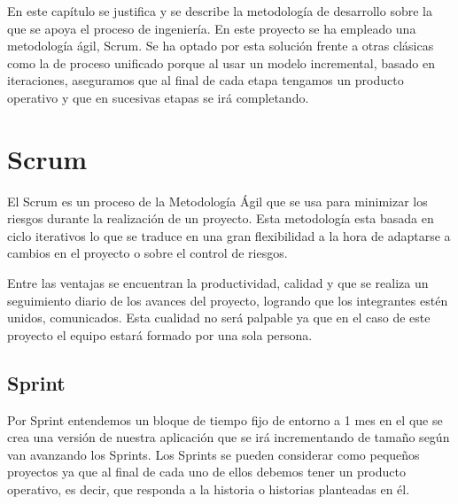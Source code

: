 En este capítulo se justifica y se describe la metodología de desarrollo sobre la que se apoya el proceso de ingeniería. En este proyecto se ha empleado una metodología ágil, Scrum. Se ha optado por esta solución frente a otras clásicas como la de proceso unificado porque al usar un modelo incremental, basado en iteraciones, aseguramos que al final de cada etapa tengamos un producto operativo y que en sucesivas etapas se irá completando.



\section{Scrum}

El Scrum es un proceso de la Metodología Ágil que se usa para minimizar los riesgos durante la realización de un proyecto. 
Esta metodología esta basada en ciclo iterativos lo que se traduce en una gran flexibilidad a la hora de adaptarse a cambios en el proyecto o sobre el control de riesgos. 



Entre las ventajas se encuentran la productividad, calidad y que se realiza un seguimiento diario de los avances del proyecto, logrando que los integrantes estén unidos, comunicados. Esta cualidad no será palpable ya que en el caso de este proyecto el equipo estará formado por una sola persona.\\

\subsection{Sprint}

Por Sprint entendemos un bloque de tiempo fijo de entorno a 1 mes en el que
se crea una versión de nuestra aplicación que se irá incrementando de tamaño
según van avanzando los Sprints. Los Sprints se pueden considerar como pequeños
proyectos ya que al final de cada uno de ellos debemos tener un producto
operativo, es decir, que responda a la historia o historias planteadas en él.



